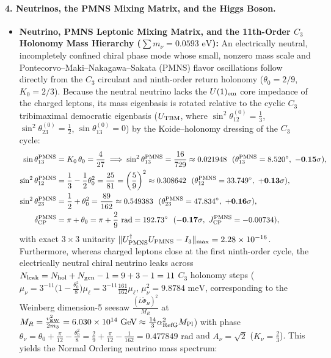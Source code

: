 \documentclass[11pt,a4paper]{article}
\begin{document}
\paragraph{4. Neutrinos, the PMNS Mixing Matrix, and the Higgs Boson.}
\begin{itemize}
\item \textbf{Neutrino, PMNS Leptonic Mixing Matrix, and the 11th-Order $C_3$ Holonomy Mass Hierarchy ($\sum m_\nu = 0.0593\text{ eV}$):} An electrically neutral, incompletely confined chiral phase mode whose small, nonzero mass scale and Pontecorvo--Maki--Nakagawa--Sakata (PMNS) flavor oscillations follow directly from the $C_3$ circulant and ninth-order return holonomy ($\theta_0 = 2/9$, $K_0 = 2/3$). Because the neutral neutrino lacks the $U(1)_{\rm em}$ core impedance of the charged leptons, its mass eigenbasis is rotated relative to the cyclic $C_3$ tribimaximal democratic eigenbasis ($U_{\rm TBM}$, where $\sin^2\theta_{12}^{(0)} = \frac{1}{3}$, $\sin^2\theta_{23}^{(0)} = \frac{1}{2}$, $\sin\theta_{13}^{(0)} = 0$) by the Koide--holonomy dressing of the $C_3$ cycle:
\begin{equation}
\begin{aligned}
\sin\theta_{13}^{\rm PMNS} &= K_0\,\theta_0 = \frac{4}{27} \implies \sin^2\theta_{13}^{\rm PMNS} = \frac{16}{729} \approx 0.021948\ \ (\theta_{13}^{\rm PMNS} = 8.520^\circ,\ \mathbf{-0.15\sigma}), \\
\sin^2\theta_{12}^{\rm PMNS} &= \frac{1}{3} - \frac{1}{2}\theta_0^2 = \frac{25}{81} = \left(\frac{5}{9}\right)^2 \approx 0.308642\ \ (\theta_{12}^{\rm PMNS} = 33.749^\circ,\ \mathbf{+0.13\sigma}), \\
\sin^2\theta_{23}^{\rm PMNS} &= \frac{1}{2} + \theta_0^2 = \frac{89}{162} \approx 0.549383\ \ (\theta_{23}^{\rm PMNS} = 47.834^\circ,\ \mathbf{+0.16\sigma}), \\
\delta_{\rm CP}^{\rm PMNS} &= \pi + \theta_0 = \pi + \frac{2}{9}\text{ rad} = 192.73^\circ\ \ (\mathbf{-0.17\sigma},\ J_{\rm CP}^{\rm PMNS} = -0.00734),
\end{aligned}
\end{equation}
with exact $3\times 3$ unitarity $\|U_{\rm PMNS}^\dagger U_{\rm PMNS} - I_3\|_{\rm max} = 2.28\times 10^{-16}$. Furthermore, whereas charged leptons close at the first ninth-order cycle, the electrically neutral chiral neutrino leaks across $N_{\rm leak} = N_{\rm hol} + N_{\rm gen} - 1 = 9 + 3 - 1 = 11$ $C_3$ holonomy steps ($\mu_\nu = 3^{-11}\bigl(1 - \frac{\theta_0^2}{8}\bigr)\mu_\ell = 3^{-11}\frac{161}{162}\mu_\ell$, $\mu_\nu^2 = 9.8784\text{ meV}$, corresponding to the Weinberg dimension-5 seesaw $\frac{(\bar{L}\tilde{\Phi}_H)^2}{M_R}$ at $M_R = \frac{v_{\rm EW}^2}{2 m_3} = 6.030\times 10^{14}\text{ GeV} \approx \frac{14}{3}\alpha_{\rm RefG}^2 M_{\rm Pl}$) with phase $\theta_\nu = \theta_0 + \frac{\pi}{12} - \frac{\theta_0^2}{8} = \frac{2}{9} + \frac{\pi}{12} - \frac{1}{162} = 0.477849\text{ rad}$ and $A_\nu = \sqrt{2}$ ($K_\nu = \frac{2}{3}$). This yields the Normal Ordering neutrino mass spectrum:

\end{itemize}
\end{document}
